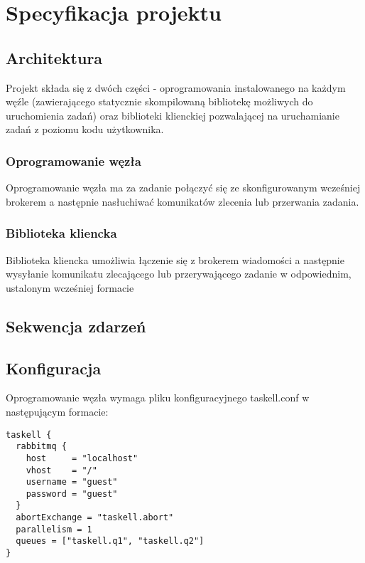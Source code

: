 \chapter{Specyfikacja projektu}
\label{cha:specyfikacjaProjektu}

\section{Architektura}
\label{sec:architektura}
Projekt składa się z dwóch części - oprogramowania instalowanego na każdym węźle (zawierającego statycznie skompilowaną bibliotekę możliwych do uruchomienia zadań) oraz biblioteki klienckiej pozwalającej na uruchamianie zadań z poziomu kodu użytkownika. 

\subsection{Oprogramowanie węzła}
\label{ssec:taskell-node}
Oprogramowanie węzła ma za zadanie połączyć się ze skonfigurowanym wcześniej brokerem a następnie nasłuchiwać komunikatów zlecenia lub przerwania zadania. 

\subsection{Biblioteka kliencka}
\label{ssec:taskell-api}
Biblioteka kliencka umożliwia łączenie się z brokerem wiadomości a następnie wysyłanie komunikatu zlecającego lub przerywającego zadanie w odpowiednim, ustalonym wcześniej formacie
\section{Sekwencja zdarzeń}
\label{sec:sekwencja}

\section{Konfiguracja}
\label{sec:konfiguracja}
Oprogramowanie węzła wymaga pliku konfiguracyjnego taskell.conf w następującym formacie:
\begin{verbatim}
taskell {
  rabbitmq {
    host     = "localhost"
    vhost    = "/"
    username = "guest"
    password = "guest"
  }
  abortExchange = "taskell.abort"
  parallelism = 1
  queues = ["taskell.q1", "taskell.q2"]
}
\end{verbatim}

